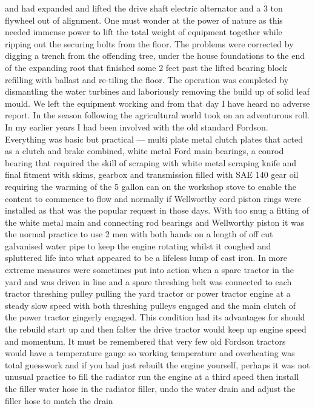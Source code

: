 and had expanded and lifted the drive shaft electric alternator and a 3 ton
flywheel out of alignment.  One must wonder at the power of nature as this
needed immense power to lift the total weight of equipment together while
ripping out the securing bolts from the floor.  The problems were corrected by
digging a trench from the offending tree, under the house foundations to the
end of the expanding root that finished some 2 feet past the lifted bearing
block refilling with ballast and re-tiling the floor.  The operation was
completed by dismantling the water turbines and laboriously removing the build
up of solid leaf mould.  We left the equipment working and from that day I have
heard no adverse report. In the season following the agricultural world took on
an adventurous roll.  In my earlier years I had been involved with the old
standard Fordson.  Everything was basic but practical --- multi plate metal
clutch plates that acted as a clutch and brake combined, white metal Ford main
bearings, a conrod bearing that required the skill of scraping with white metal
scraping knife and final fitment with skims, gearbox and transmission filled
with SAE 140 gear oil requiring the warming of the 5 gallon can on the workshop
stove to enable the content to commence to flow and normally if Wellworthy cord
piston rings were installed as that was the popular request in those days. With
too snug a fitting of the white metal main and connecting rod bearings and
Wellworthy piston it was the normal practice to use 2 men with both hands on a
length of off cut galvanised water pipe to keep the engine rotating whilst it
coughed and spluttered life into what appeared to be a lifeless lump of cast
iron. In more extreme measures were sometimes put into action when a spare
tractor in the yard and was driven in line and a spare threshing belt was
connected to each tractor threshing pulley pulling the yard tractor or power
tractor engine at a steady slow speed with both threshing pulleys engaged and
the main clutch of the power tractor gingerly engaged. This condition had its
advantages for should the rebuild start up and then falter the drive tractor
would keep up engine speed and momentum.  It must be remembered that very few
old Fordson tractors would have a temperature gauge so working temperature and
overheating was total guesswork and if you had just rebuilt the engine
yourself, perhaps it was not unusual practice to fill the radiator run the
engine at a third speed then install the filler water hose in the radiator
filler, undo the water drain and adjust the filler hose to match the drain
